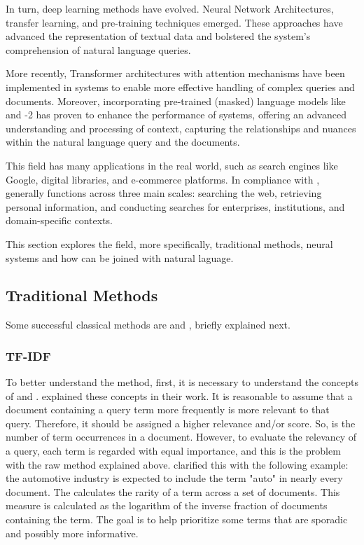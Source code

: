 In turn, deep learning methods have evolved. Neural Network Architectures, transfer learning, and pre-training techniques emerged. These approaches have advanced the representation of textual data and bolstered the {\ir} system's comprehension of natural language queries.

More recently, Transformer architectures with attention mechanisms have been implemented in {\ir} systems to enable more effective handling of complex queries and documents. Moreover, incorporating pre-trained (masked) language models like {\bert} \cite{devlin_bert_2018} and {\gpt}-2 has proven to enhance the performance of {\ir} systems, offering an advanced understanding and processing of context, capturing the relationships and nuances within the natural language query and the documents.

This field has many applications in the real world, such as search engines like Google, digital libraries, and e-commerce platforms. In compliance with \citet{p_m_efficient_2021}, {\ir} generally functions across three main scales: searching the web, retrieving personal information, and conducting searches for enterprises, institutions, and domain-specific contexts.

This section explores the {\ir} field, more specifically, traditional methods, neural {\ir} systems and how {\ir} can be joined with natural laguage.


\subsection{Traditional Methods}

Some successful classical methods are {\tfidf} and {\bm}, briefly explained next.

\subsubsection{TF-IDF}

To better understand the {\tfidf} method, first, it is necessary to understand the concepts of {\tf} and {\idf}. \citet{manning_introduction_2009} explained these concepts in their work. It is reasonable to assume that a document containing a query term more frequently is more relevant to that query. Therefore, it should be assigned a higher relevance and/or score. So, {\tf} is the number of term occurrences in a document. However, to evaluate the relevancy of a query, each term is regarded with equal importance, and this is the problem with the raw method explained above. \citet{manning_introduction_2009} clarified this with the following example: the automotive industry is expected to include the term "auto" in nearly every document. The  {\idf} calculates the rarity of a term across a set of documents. This measure is calculated as the logarithm of the inverse fraction of documents containing the term. The goal is to help prioritize some terms that are sporadic and possibly more informative.

